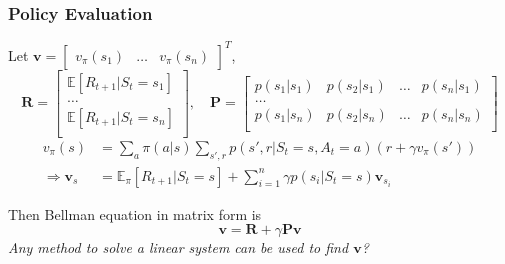 \documentclass[10pt]{beamer}
\theoremstyle{remark}
\begin{document}
\begin{frame}
    \frametitle{Policy Evaluation}
    Let $\bm{v} =
    \begin{bmatrix}
        v_\pi(s_1) & \ldots  & v_\pi(s_n)
    \end{bmatrix}^T  
    $,     \[
    \bm{R}  = \begin{bmatrix}
    \mathbb{E}[R_{t+1}| S_t = s_1] \\
    \ldots  \\
    \mathbb{E}[R_{t+1}| S_t = s_n] \\
    \end{bmatrix} , \quad
    \bm{P} = \begin{bmatrix}
        p(s_1 | s_1) & p(s_2 | s_1) & \ldots  & p(s_n | s_1) \\
        \ldots  \\
        p(s_1 | s_n) & p(s_2 | s_n) & \ldots  & p(s_n | s_n) \\
    \end{bmatrix} 
    \] 
\begin{align*}
    v_\pi(s) 
    &= \sum_{a} \pi(a|s) \sum_{s', r} p(s', r| S_t = s, A_t = a) \left( r + \gamma v_\pi(s') \right)  \\
    \Rightarrow \bm{v}_s &= \mathbb{E}_\pi [R_{t+1}| S_t = s] + \sum^{n}_{i=1} \gamma p(s_i | S_t = s)  \bm{v}_{s_i}
\end{align*} 

    Then Bellman equation in matrix form is
    \[
        \bm{v} = \bm{R} + \gamma \bm{P} \bm{v} 
    \] 
    \textit{Any method to solve a linear system can be used to find $\bm{v}$?}
\end{frame}
\end{document}
